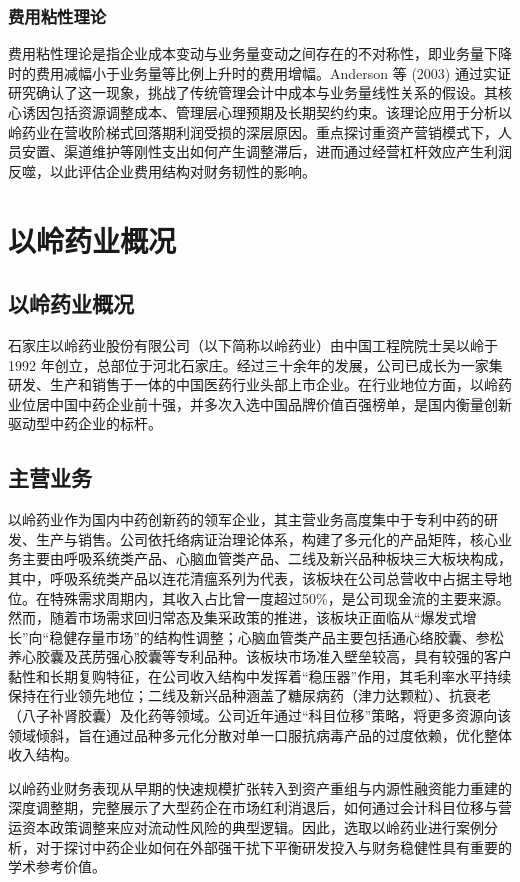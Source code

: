 \documentclass[12pt,a4paper,fontset=windows,UTF8]{ctexart}
\begin{document}
\subsubsection{费用粘性理论}
费用粘性理论是指企业成本变动与业务量变动之间存在的不对称性，即业务量下降时的费用减幅小于业务量等比例上升时的费用增幅。Anderson 等 (2003) 通过实证研究确认了这一现象，挑战了传统管理会计中成本与业务量线性关系的假设。其核心诱因包括资源调整成本、管理层心理预期及长期契约约束。该理论应用于分析以岭药业在营收阶梯式回落期利润受损的深层原因。重点探讨重资产营销模式下，人员安置、渠道维护等刚性支出如何产生调整滞后，进而通过经营杠杆效应产生利润反噬，以此评估企业费用结构对财务韧性的影响。

\section{以岭药业概况}
\subsection{以岭药业概况}
石家庄以岭药业股份有限公司（以下简称以岭药业）由中国工程院院士吴以岭于 1992 年创立，总部位于河北石家庄。经过三十余年的发展，公司已成长为一家集研发、生产和销售于一体的中国医药行业头部上市企业。在行业地位方面，以岭药业位居中国中药企业前十强，并多次入选中国品牌价值百强榜单，是国内衡量创新驱动型中药企业的标杆。

\subsection{主营业务}
以岭药业作为国内中药创新药的领军企业，其主营业务高度集中于专利中药的研发、生产与销售。公司依托络病证治理论体系，构建了多元化的产品矩阵，核心业务主要由呼吸系统类产品、心脑血管类产品、二线及新兴品种板块三大板块构成，其中，呼吸系统类产品以连花清瘟系列为代表，该板块在公司总营收中占据主导地位。在特殊需求周期内，其收入占比曾一度超过50\%，是公司现金流的主要来源。然而，随着市场需求回归常态及集采政策的推进，该板块正面临从“爆发式增长”向“稳健存量市场”的结构性调整；心脑血管类产品主要包括通心络胶囊、参松养心胶囊及芪苈强心胶囊等专利品种。该板块市场准入壁垒较高，具有较强的客户黏性和长期复购特征，在公司收入结构中发挥着“稳压器”作用，其毛利率水平持续保持在行业领先地位；二线及新兴品种涵盖了糖尿病药（津力达颗粒）、抗衰老（八子补肾胶囊）及化药等领域。公司近年通过“科目位移”策略，将更多资源向该领域倾斜，旨在通过品种多元化分散对单一口服抗病毒产品的过度依赖，优化整体收入结构。

以岭药业财务表现从早期的快速规模扩张转入到资产重组与内源性融资能力重建的深度调整期，完整展示了大型药企在市场红利消退后，如何通过会计科目位移与营运资本政策调整来应对流动性风险的典型逻辑。因此，选取以岭药业进行案例分析，对于探讨中药企业如何在外部强干扰下平衡研发投入与财务稳健性具有重要的学术参考价值。
\end{document}
